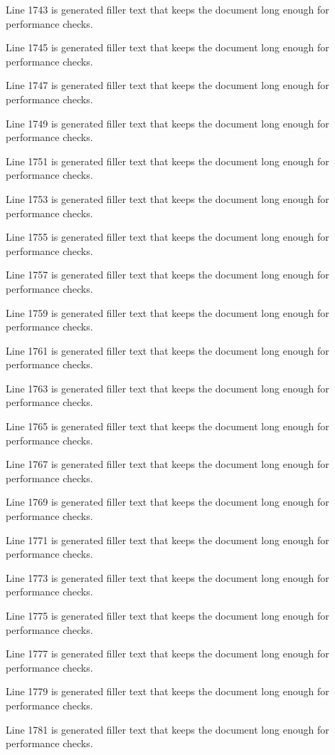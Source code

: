 Line 1743 is generated filler text that keeps the document long enough for performance checks.

Line 1745 is generated filler text that keeps the document long enough for performance checks.

Line 1747 is generated filler text that keeps the document long enough for performance checks.

Line 1749 is generated filler text that keeps the document long enough for performance checks.

Line 1751 is generated filler text that keeps the document long enough for performance checks.

Line 1753 is generated filler text that keeps the document long enough for performance checks.

Line 1755 is generated filler text that keeps the document long enough for performance checks.

Line 1757 is generated filler text that keeps the document long enough for performance checks.

Line 1759 is generated filler text that keeps the document long enough for performance checks.

Line 1761 is generated filler text that keeps the document long enough for performance checks.

Line 1763 is generated filler text that keeps the document long enough for performance checks.

Line 1765 is generated filler text that keeps the document long enough for performance checks.

Line 1767 is generated filler text that keeps the document long enough for performance checks.

Line 1769 is generated filler text that keeps the document long enough for performance checks.

Line 1771 is generated filler text that keeps the document long enough for performance checks.

Line 1773 is generated filler text that keeps the document long enough for performance checks.

Line 1775 is generated filler text that keeps the document long enough for performance checks.

Line 1777 is generated filler text that keeps the document long enough for performance checks.

Line 1779 is generated filler text that keeps the document long enough for performance checks.

Line 1781 is generated filler text that keeps the document long enough for performance checks.

